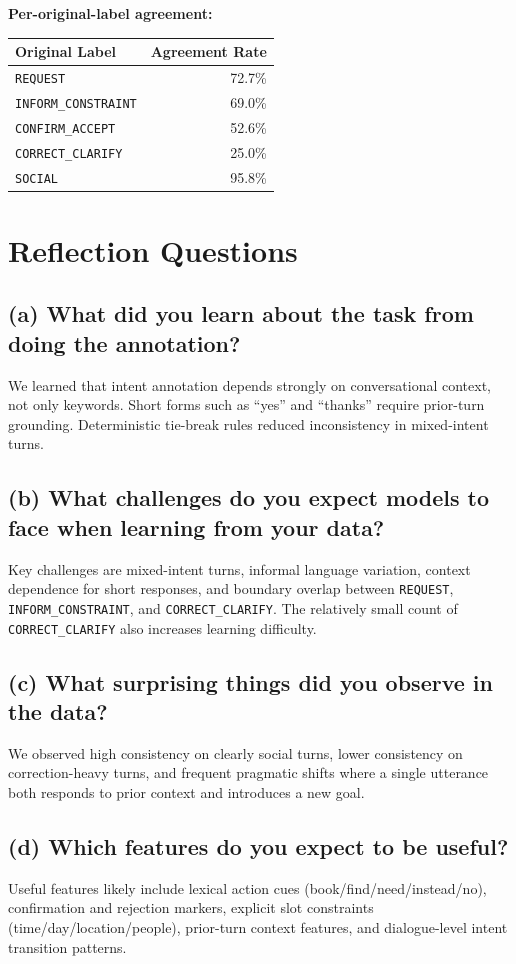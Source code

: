 \documentclass[11pt]{article}
\begin{document}
\textbf{Per-original-label agreement:}
\begin{center}
\begin{tabular}{lr}
\toprule
\textbf{Original Label} & \textbf{Agreement Rate} \\
\midrule
\texttt{REQUEST} & 72.7\% \\
\texttt{INFORM\_CONSTRAINT} & 69.0\% \\
\texttt{CONFIRM\_ACCEPT} & 52.6\% \\
\texttt{CORRECT\_CLARIFY} & 25.0\% \\
\texttt{SOCIAL} & 95.8\% \\
\bottomrule
\end{tabular}
\end{center}

\section{Reflection Questions}
\subsection*{(a) What did you learn about the task from doing the annotation?}
We learned that intent annotation depends strongly on conversational context, not only keywords. Short forms such as ``yes'' and ``thanks'' require prior-turn grounding. Deterministic tie-break rules reduced inconsistency in mixed-intent turns.

\subsection*{(b) What challenges do you expect models to face when learning from your data?}
Key challenges are mixed-intent turns, informal language variation, context dependence for short responses, and boundary overlap between \texttt{REQUEST}, \texttt{INFORM\_CONSTRAINT}, and \texttt{CORRECT\_CLARIFY}. The relatively small count of \texttt{CORRECT\_CLARIFY} also increases learning difficulty.

\subsection*{(c) What surprising things did you observe in the data?}
We observed high consistency on clearly social turns, lower consistency on correction-heavy turns, and frequent pragmatic shifts where a single utterance both responds to prior context and introduces a new goal.

\subsection*{(d) Which features do you expect to be useful?}
Useful features likely include lexical action cues (book/find/need/instead/no), confirmation and rejection markers, explicit slot constraints (time/day/location/people), prior-turn context features, and dialogue-level intent transition patterns.
\end{document}
